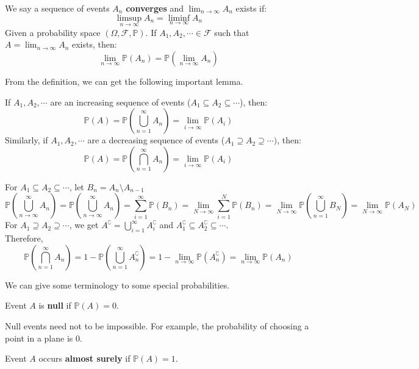 \documentclass{huhtakm-template-book}
\newcommand{\prob}{\mathbb{P}}
\begin{document}
\begin{defn}
	We say a sequence of events $A_{n}$ \textbf{converges} and $\lim_{n\to\infty}A_{n}$ exists if:
	\begin{equation*}
		\limsup_{n\to\infty}A_{n}=\liminf_{n\to\infty}A_{n}
	\end{equation*}
	Given a probability space $(\Omega,\mathcal{F},\prob)$. If $A_{1},A_{2},\cdots\in\mathcal{F}$ such that $A=\lim_{n\to\infty}A_{n}$ exists, then:
	\begin{equation*}
		\lim_{n\to\infty}\prob(A_{n})=\prob\left(\lim_{n\to\infty}A_{n}\right)
	\end{equation*}
\end{defn}
From the definition, we can get the following important lemma.
\begin{lem}
	\label{Chapter 2 (Lemma) Continuous probability}
	If $A_{1},A_{2},\cdots$ are an increasing sequence of events ($A_{1}\subseteq A_{2}\subseteq\cdots$), then:
	\begin{equation*}
		\prob(A)=\prob\left(\bigcup_{n=1}^{\infty}A_{n}\right)=\lim_{i\to\infty}\prob(A_{i})
	\end{equation*}
	Similarly, if $A_{1},A_{2},\cdots$ are a decreasing sequence of events ($A_{1}\supseteq A_{2}\supseteq\cdots)$, then:
	\begin{equation*}
		\prob(A)=\prob\left(\bigcap_{n=1}^{\infty}A_{n}\right)=\lim_{i\to\infty}\prob(A_{i})
	\end{equation*}
\end{lem}
\begin{proofing}
	For $A_{1}\subseteq A_{2}\subseteq\cdots$, let $B_{n}=A_{n}\setminus A_{n-1}$
	\begin{equation*}
		\prob\left(\bigcup_{n\to\infty}^{\infty}A_{n}\right)=\prob\left(\bigcup_{n\to\infty}^{\infty}A_{n}\right)=\sum_{i=1}^{\infty}\prob(B_{n})=\lim_{N\to\infty}\sum_{i=1}^{N}\prob(B_{n})=\lim_{N\to\infty}\prob\left(\bigcup_{n=1}^{\infty}B_{N}\right)=\lim_{N\to\infty}\prob(A_{N})
	\end{equation*}
	For $A_{1}\supseteq A_{2}\supseteq\cdots$, we get $A^{\complement}=\bigcup_{i=1}^{\infty}A_{i}^{\complement}$ and $A_{1}^{\complement}\subseteq A_{2}^{\complement}\subseteq\cdots$.\\
	Therefore,
	\begin{equation*}
		\prob\left(\bigcap_{n=1}^{\infty}A_{n}\right)=1-\prob\left(\bigcup_{n=1}^{\infty}A_{n}^{\complement}\right)=1-\lim_{n\to\infty}\prob(A_{n}^{\complement})=\lim_{n\to\infty}\prob(A_{n})
	\end{equation*}
\end{proofing}
We can give some terminology to some special probabilities.
\begin{defn}
	Event $A$ is \textbf{null} if $\prob(A)=0$.
\end{defn}
\begin{rem}
	Null events need not to be impossible. For example, the probability of choosing a point in a plane is $0$.
\end{rem}
\begin{defn}
	Event $A$ occurs \textbf{almost surely} if $\prob(A)=1$.
\end{defn}
\end{document}
